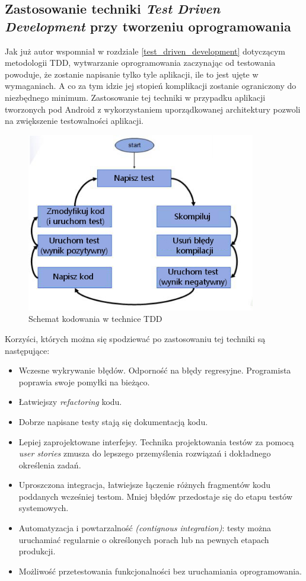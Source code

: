 \subsection{Zastosowanie techniki \textit{Test Driven Development} przy tworzeniu oprogramowania}
Jak już autor wspomniał w rozdziale \ref{test_driven_development} dotyczącym metodologii TDD, wytwarzanie oprogramowania zaczynając od testowania powoduje, że zostanie napisanie tylko tyle aplikacji, ile to jest ujęte w wymaganiach. A co za tym idzie jej stopień komplikacji zostanie ograniczony do niezbędnego minimum. Zastosowanie tej techniki w przypadku aplikacji tworzonych pod Android z wykorzystaniem uporządkowanej architektury pozwoli na zwiększenie testowalności aplikacji. 

\begin{figure}[!htb]
    \centering
    \includegraphics[width=10cm]{imgs/ch4_tdd.jpg}
    \caption
{Schemat kodowania w technice TDD}
    \label{fig:tdd_schema}
\end{figure} 

Korzyści, których można się spodziewać po zastosowaniu tej techniki są następujące:

\begin{itemize}
\item
Wczesne wykrywanie błędów. Odporność na błędy regresyjne. Programista poprawia swoje pomyłki na bieżąco.
\item
Łatwiejszy \textit{refactoring} kodu.
\item
Dobrze napisane testy stają się dokumentacją kodu.
\item
Lepiej zaprojektowane interfejsy. Technika projektowania testów za pomocą \textit{user stories} zmusza do lepszego przemyślenia rozwiązań i dokładnego określenia zadań. 
\item
Uproszczona integracja, łatwiejsze łączenie różnych fragmentów kodu poddanych wcześniej testom. Mniej błędów przedostaje się do etapu testów systemowych.
\item
Automatyzacja i powtarzalność \textit{(contignous integration)}: testy można uruchamiać regularnie o określonych porach lub na pewnych etapach produkcji. 
\item
Możliwość przetestowania funkcjonalności bez uruchamiania oprogramowania.
\end{itemize}

